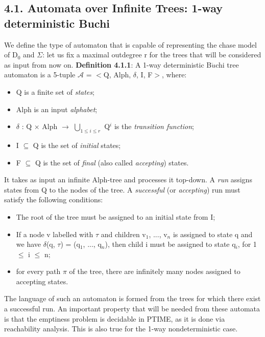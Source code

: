 \documentclass[11pt, a4paper, dvipsnames]{article}
\begin{document}
\subsection{4.1. Automata over Infinite Trees: 1-way deterministic Buchi}
We define the type of automaton that is capable of representing the chase model of D$_{0}$ and $\Sigma$: let us fix a maximal outdegree r for the trees that will be considered as input from now on.\newline
\textbf{Definition 4.1.1}: A 1-way deterministic B$\ddot{u}$chi tree automaton is a 5-tuple \newline
$\mathcal{A}$ = $<$Q, Alph, $\delta$, I, F$>$, where:
\begin{itemize}
	\item Q is a finite set of \textit{states};
	\item Alph is an input \textit{alphabet};
	\item $\delta$ : Q $\times$ Alph $\rightarrow$ $\bigcup_{1 \leq i \leq r}$ Q$^{i}$ is the \textit{transition function};
	\item I $\subseteq$ Q is the set of \textit{initial} states;
	\item F $\subseteq$ Q is the set of \textit{final} (also called \textit{accepting}) states.
\end{itemize}
It takes as input an infinite Alph-tree and processes it top-down. A \textit{run} assigns states from Q to the nodes of the tree. A \textit{successful} (or \textit{accepting}) run must satisfy the following conditions:
\begin{itemize}
	\item The root of the tree must be assigned to an initial state from I;
	\item If a node v labelled with $\tau$ and children v$_{1}$, ..., v$_{n}$ is assigned to state q and we have $\delta$(q, $\tau$) = (q$_{1}$, ..., q$_{n}$), then child i must be assigned to state q$_{i}$, for 1 $\leq$ i $\leq$ n;
	\item for every path $\pi$ of the tree, there are infinitely many nodes assigned to accepting states. 
\end{itemize}
The language of such an automaton is formed from the trees for which there exist a successful run. An important property that will be needed from these automata is that the emptiness problem is decidable in PTIME, as it is done via reachability analysis. This is also true for the 1-way nondeterministic case.
\end{document}
